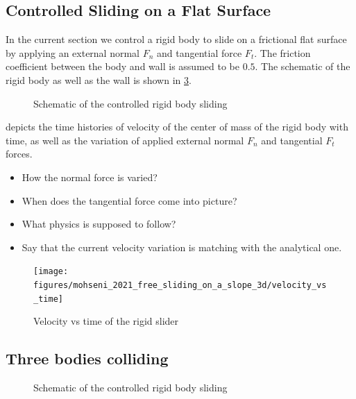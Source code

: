 \documentclass[preprint,12pt]{elsarticle}
\begin{document}
\FloatBarrier%
\subsection{Controlled Sliding on a Flat Surface}
\label{sec:controlled-rigid-body-sliding}

In the current section we control a rigid body to slide on a frictional flat
surface by applying an external normal $F_n$ and tangential force $F_t$. The
friction coefficient between the body and wall is assumed to be $0.5$. The
schematic of the rigid body as well as the wall is shown in
\cref{fig:schematic-controlled-rigid-body-sliding}.
\begin{figure}[!htpb]
  \centering
  \caption{Schematic of the controlled rigid body sliding}
\label{fig:schematic-controlled-rigid-body-sliding}
\end{figure}

 depicts the time histories of
velocity of the center of mass of the rigid body with time, as well as the
variation of applied external normal $F_n$ and tangential $F_t$ forces.
\begin{itemize}
\item How the normal force is varied?
\item When does the tangential force come into picture?
\item What physics is supposed to follow?
\item Say that the current velocity variation is matching with the analytical one.
\end{itemize}
\begin{figure}[!htpb]
  \centering
  \texttt{[image: figures/mohseni\_2021\_free\_sliding\_on\_a\_slope\_3d/velocity\_vs\_time]}
  \caption{Velocity vs time of the rigid slider}
\label{fig:velocity-vs-time-controlled-sliding}
\end{figure}


\FloatBarrier%
\subsection{Three bodies colliding}
\label{sec:three-bodies-colliding}


\begin{figure}[!htpb]
  \centering
  \caption{Schematic of the controlled rigid body sliding}
\label{fig:schematic-controlled-rigid-body-sliding}
\end{figure}
\end{document}
